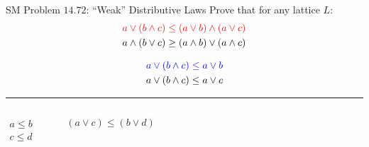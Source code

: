 
\begin{frame}{}
  \begin{exampleblock}{SM Problem $14.72$: ``Weak'' Distributive Laws}
    Prove that for any lattice $L$:
    \begin{align*}
      \textcolor{red}{a \lor (b \land c) \le (a \lor b) \land (a \lor c)} \\
      a \land (b \lor c) \ge (a \land b) \lor (a \land c)
    \end{align*}
  \end{exampleblock}

  \pause
  \begin{align*}
    \textcolor{blue}{a \lor (b \land c) \le a \lor b} \\
    a \lor (b \land c) \le a \lor c
  \end{align*}

  \hrule
  \pause
  \begin{columns}
      \begin{align*}
	a \le b \\
	c \le d \\
      \end{align*}
      \vspace{-1.2cm}
      \hrule
      \vspace{-0.3cm}
      \[
	(a \lor c) \le (b \lor d)
      \]
  \end{columns}
\end{frame}

% 
